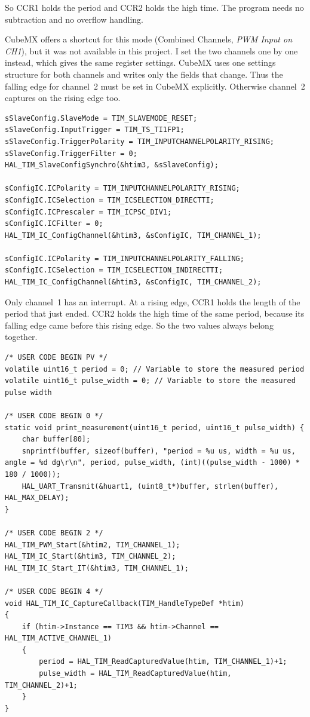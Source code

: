 \documentclass[11pt,a4paper]{article}
\begin{document}
So CCR1 holds the period and CCR2 holds the high time. The program needs no
subtraction and no overflow handling.

CubeMX offers a shortcut for this mode (Combined Channels, \emph{PWM Input on
CH1}), but it was not available in this project. I set the two channels one by
one instead, which gives the same register settings. CubeMX uses one settings
structure for both channels and writes only the fields that change. Thus the
falling edge for channel~2 must be set in CubeMX explicitly. Otherwise
channel~2 captures on the rising edge too.

\begin{lstlisting}[caption={Generated TIM3 configuration (\texttt{MX\_TIM3\_Init()}, error checks removed).}]
sSlaveConfig.SlaveMode = TIM_SLAVEMODE_RESET;
sSlaveConfig.InputTrigger = TIM_TS_TI1FP1;
sSlaveConfig.TriggerPolarity = TIM_INPUTCHANNELPOLARITY_RISING;
sSlaveConfig.TriggerFilter = 0;
HAL_TIM_SlaveConfigSynchro(&htim3, &sSlaveConfig);

sConfigIC.ICPolarity = TIM_INPUTCHANNELPOLARITY_RISING;
sConfigIC.ICSelection = TIM_ICSELECTION_DIRECTTI;
sConfigIC.ICPrescaler = TIM_ICPSC_DIV1;
sConfigIC.ICFilter = 0;
HAL_TIM_IC_ConfigChannel(&htim3, &sConfigIC, TIM_CHANNEL_1);

sConfigIC.ICPolarity = TIM_INPUTCHANNELPOLARITY_FALLING;
sConfigIC.ICSelection = TIM_ICSELECTION_INDIRECTTI;
HAL_TIM_IC_ConfigChannel(&htim3, &sConfigIC, TIM_CHANNEL_2);
\end{lstlisting}

Only channel~1 has an interrupt. At a rising edge, CCR1 holds the length of the
period that just ended. CCR2 holds the high time of the same period, because
its falling edge came before this rising edge. So the two values always belong
together.

\begin{lstlisting}[label={lst:methodb},caption={Method B user code (\texttt{main.c}, user code blocks PV, 0, 2 and 4).}]
/* USER CODE BEGIN PV */
volatile uint16_t period = 0; // Variable to store the measured period
volatile uint16_t pulse_width = 0; // Variable to store the measured pulse width

/* USER CODE BEGIN 0 */
static void print_measurement(uint16_t period, uint16_t pulse_width) {
    char buffer[80];
    snprintf(buffer, sizeof(buffer), "period = %u us, width = %u us, angle = %d dg\r\n", period, pulse_width, (int)((pulse_width - 1000) * 180 / 1000));
    HAL_UART_Transmit(&huart1, (uint8_t*)buffer, strlen(buffer), HAL_MAX_DELAY);
}

/* USER CODE BEGIN 2 */
HAL_TIM_PWM_Start(&htim2, TIM_CHANNEL_1);
HAL_TIM_IC_Start(&htim3, TIM_CHANNEL_2);
HAL_TIM_IC_Start_IT(&htim3, TIM_CHANNEL_1);

/* USER CODE BEGIN 4 */
void HAL_TIM_IC_CaptureCallback(TIM_HandleTypeDef *htim)
{
    if (htim->Instance == TIM3 && htim->Channel == HAL_TIM_ACTIVE_CHANNEL_1)
    {
        period = HAL_TIM_ReadCapturedValue(htim, TIM_CHANNEL_1)+1;
        pulse_width = HAL_TIM_ReadCapturedValue(htim, TIM_CHANNEL_2)+1;
    }
}
\end{lstlisting}
\end{document}
